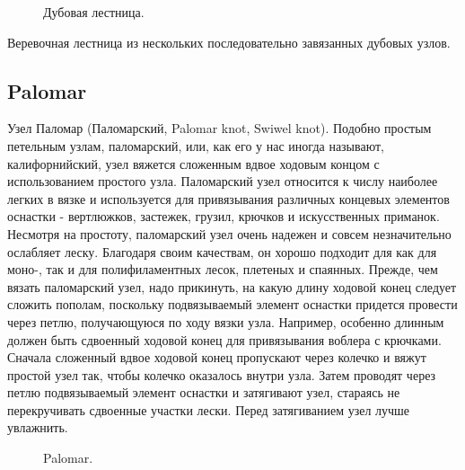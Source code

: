 \begin{figure}[H]\centering
	\begin{minipage}{1\linewidth}
		\begin{center}
			\tcbox[enhanced jigsaw,colframe=black,opacityframe=0.5,opacityback=0.5]
			{\centering{}}
		\end{center}
	\end{minipage}
\caption{Дубовая лестница.}
\label{ris:Dubovaya_trap}
\end{figure}

Веревочная лестница из нескольких последовательно завязанных дубовых узлов.

\subsection{Palomar}

\begin{figure}[H]\centering
	\subfloat[Завязывание]{\label{ris:Palomar_1}
	\tcbox[enhanced jigsaw,colframe=black,opacityframe=0.5,opacityback=0.5]
		{\centering
			}
		}
\end{figure}

Узел Паломар (Паломарский, Palomar knot, Swiwel knot). Подобно простым петельным узлам, паломарский, или, как его у нас иногда называют, калифорнийский, узел вяжется сложенным вдвое ходовым концом с использованием простого узла. Паломарский узел относится к числу наиболее легких в вязке и используется для привязывания различных концевых элементов оснастки - вертлюжков, застежек, грузил, крючков и искусственных приманок. Несмотря на простоту, паломарский узел очень надежен и совсем незначительно ослабляет леску. Благодаря своим качествам, он хорошо подходит для как для моно-, так и для полифиламентных лесок, плетеных и спаянных. Прежде, чем вязать паломарский узел, надо прикинуть, на какую длину ходовой конец следует сложить пополам, поскольку подвязываемый элемент оснастки придется провести через петлю, получающуюся по ходу вязки узла. Например, особенно длинным должен быть сдвоенный ходовой конец для привязывания воблера с крючками. Сначала сложенный вдвое ходовой конец пропускают через колечко и вяжут простой узел так, чтобы колечко оказалось внутри узла. Затем проводят через петлю подвязываемый элемент оснастки и затягивают узел, стараясь не перекручивать сдвоенные участки лески. Перед затягиванием узел лучше увлажнить.

\begin{figure}[H]\centering
	\subfloat[Результат]{\label{ris:Palomar_2}
	\tcbox[enhanced jigsaw,colframe=black,opacityframe=0.5,opacityback=0.5]
		{\centering
			}
		}
	\caption{Palomar.}\label{ris:Palomar}
\end{figure}

